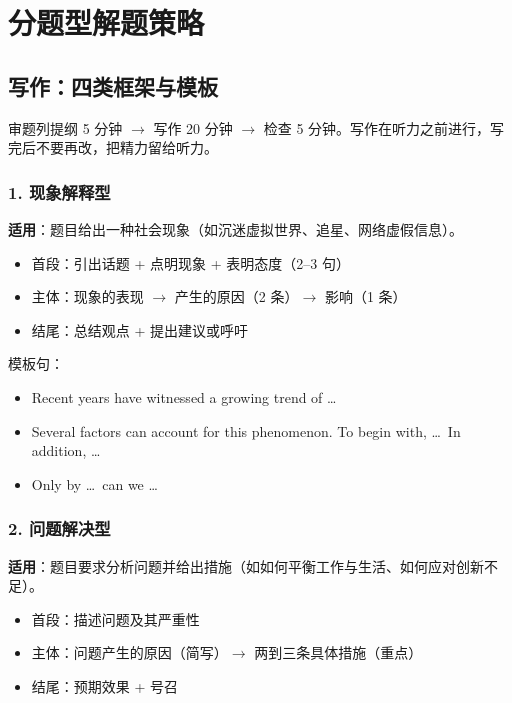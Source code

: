 \section{分题型解题策略}

\subsection{写作：四类框架与模板}

\begin{tipbox}[时间分配（30 分钟）]
审题列提纲 5 分钟 $\to$ 写作 20 分钟 $\to$ 检查 5 分钟。写作在听力之前进行，写完后不要再改，把精力留给听力。
\end{tipbox}

\subsubsection*{1. 现象解释型}

\textbf{适用}：题目给出一种社会现象（如沉迷虚拟世界、追星、网络虚假信息）。

\begin{itemize}
  \item 首段：引出话题 + 点明现象 + 表明态度（2--3 句）
  \item 主体：现象的表现 $\to$ 产生的原因（2 条）$\to$ 影响（1 条）
  \item 结尾：总结观点 + 提出建议或呼吁
\end{itemize}

模板句：
\begin{itemize}
  \item Recent years have witnessed a growing trend of \ldots
  \item Several factors can account for this phenomenon. To begin with, \ldots\ In addition, \ldots
  \item Only by \ldots\ can we \ldots
\end{itemize}

\subsubsection*{2. 问题解决型}

\textbf{适用}：题目要求分析问题并给出措施（如如何平衡工作与生活、如何应对创新不足）。

\begin{itemize}
  \item 首段：描述问题及其严重性
  \item 主体：问题产生的原因（简写）$\to$ 两到三条具体措施（重点）
  \item 结尾：预期效果 + 号召
\end{itemize}

